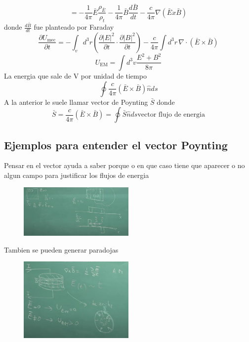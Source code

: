 \documentclass{article}
\begin{document}
		\begin{equation*}
			= -\frac{1}{4\pi}\bar{E}\frac{\rho_{\bar{E}}}{\rho_{t}} -\frac{1}{4\pi}\bar{B}\frac{d\bar{B}}{dt}-\frac{c}{4\pi}\nabla(\bar{E}x\bar{B})
		\end{equation*}
		donde \(\frac{d\bar{B}}{dt}\) fue planteado por Faraday
		\begin{equation}
			\frac{\partial U_{\text{mec}}}{\partial t} = - \int_{v} d^3r \left( \frac{\partial |E|^2}{\partial t} \cdot \frac{\partial |B|^2}{\partial t} \right) - \frac{c}{4\pi} \int d^3r \, \nabla \cdot \left( \bar{E} \times \bar{B} \right)			
		\end{equation}
		\begin{equation*}
			U_{\text{EM}}= \int d^3v \frac{E^2 +B^2}{8\pi}
		\end{equation*}		
		La energia que sale de V por unidad de tiempo
		\begin{equation*}
			\oint \frac{c}{4\pi}(\bar{E}\times\bar{B})\hat{n}ds
		\end{equation*}		
		A la anterior le suele llamar vector de Poynting \(\bar{S}\)
		donde
		\begin{equation}
			\bar{S}=\frac{c}{4\pi}(\bar{E}\times\bar{B})= \oint \bar{S}\hat{n}ds \text{vector flujo de energia}
		\end{equation}	
		\subsection{Ejemplos para entender el vector Poynting}
		Pensar en el vector ayuda a saber porque o en que caso tiene que aparecer o no algun campo para justificar los flujos de energia
		\begin{figure}[h]
			\centering 
			\includegraphics[width=0.5\textwidth]{imagen2.jpg}
			\label{fig:mi_imagen3} 
		\end{figure}
		Tambien se pueden generar paradojas
		\begin{figure}[h]
			\centering 
			\includegraphics[width=0.5\textwidth]{imagen3.jpg}
			\label{fig:mi_imagen4} 
		\end{figure}
\end{document}
